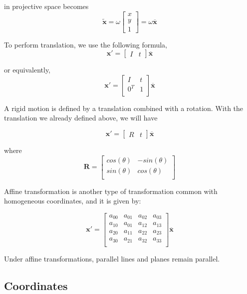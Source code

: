 \documentclass{article}
\begin{document}
in projective space becomes
\[\tilde{\mathbf{x}} = \omega \begin{bmatrix}
    x \\ y \\ 1
\end{bmatrix} = \omega \overline{\mathbf{x}}\]

To perform translation, we use the following formula, 
\[{\mathbf{x}}' = \begin{bmatrix}
    I &t
\end{bmatrix} \overline{\mathbf{x}}\]

or equivalently, 
\[{\mathbf{x}}' = \begin{bmatrix}
    I &t \\
    0^T &1 \\
\end{bmatrix} \overline{\mathbf{x}}\]

A rigid motion is defined by a translation combined with a rotation. With the translation we already defined above, we will have

\[{\mathbf{x}}' = \begin{bmatrix}
    R &t
\end{bmatrix} \overline{\mathbf{x}}\]

where 
\[{\mathbf{R}} = \begin{bmatrix}
    cos(\theta) &-sin(\theta) \\
    sin(\theta) &cos(\theta) \\
\end{bmatrix}\]

Affine transformation is another type of transformation common with homogeneous coordinates, and it is given by:

\[\mathbf{x}' = \begin{bmatrix}
    a_{00} &a_{01} &a_{02} &a_{03} \\
    a_{10} &a_{01} &a_{12} &a_{13} \\
    a_{20} &a_{11} &a_{22} &a_{23} \\
    a_{30} &a_{21} &a_{32} &a_{33} \\
\end{bmatrix} \overline{\mathbf{x}}\]

Under affine transformations, parallel lines and planes remain parallel.

\subsection{Coordinates}
\end{document}
